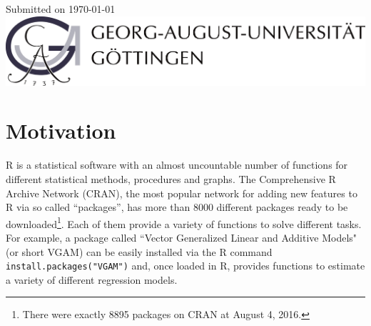 \documentclass[12pt]{article} %
\newcommand{\li}{\lstinline}
\begin{document}
\begin{titlepage}

{\large Submitted on \today}\\[3.2cm] %


\includegraphics{figures/logo}\\[1cm]
 

\vfill %
\end{titlepage}
\restoregeometry
\clearpage

\tableofcontents


\clearpage

\listoffigures

\lstlistoflistings

\clearpage


\section{Motivation}

R is a statistical software with an almost uncountable number of functions for different statistical methods, procedures and graphs. The Comprehensive R Archive Network (CRAN), the most popular network for adding new features to R via so called ``packages'', has more than 8000 different packages ready to be downloaded\footnote{There were exactly 8895 packages on CRAN at August 4, 2016.}. Each of them provide a variety of functions to solve different tasks. For example, a package called ``Vector Generalized Linear and Additive Models" (or short VGAM) can be easily installed via the R command \li{install.packages("VGAM")} and, once loaded in R, provides functions to estimate a variety of different regression models.
\end{document}
